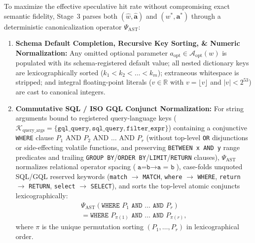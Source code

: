 \documentclass[10pt,conference]{IEEEtran}
\begin{document}
To maximize the effective speculative hit rate without compromising exact semantic fidelity, Stage~3 parses both $(\hat{w}, \hat{\mathbf{a}})$ and $(w^*, \mathbf{a}^*)$ through a deterministic canonicalization operator $\Psi_{\text{AST}}$:
\begin{enumerate}
    \item \textbf{Schema Default Completion, Recursive Key Sorting, \& Numeric Normalization:} Any omitted optional parameter $a_{\text{opt}} \in \mathcal{A}_{\text{opt}}(w)$ is populated with its schema-registered default value; all nested dictionary keys are lexicographically sorted ($k_1 < k_2 < \dots < k_m$); extraneous whitespace is stripped; and integral floating-point literals ($v \in \mathbb{R}$ with $v = \lfloor v \rfloor$ and $|v| < 2^{53}$) are cast to canonical integers.
    \item \textbf{Commutative SQL / ISO GQL Conjunct Normalization:} For string arguments bound to registered query-language keys ($\mathcal{K}_{\text{query\_args}} = \{\texttt{gql\_query}, \texttt{sql\_query}, \texttt{filter\_expr}\}$) containing a conjunctive \texttt{WHERE} clause $P_1 \text{ AND } P_2 \text{ AND } \dots \text{ AND } P_r$ (without top-level \texttt{OR} disjunctions or side-effecting volatile functions, and preserving \texttt{BETWEEN x AND y} range predicates and trailing \texttt{GROUP BY}/\texttt{ORDER BY}/\texttt{LIMIT}/\texttt{RETURN} clauses), $\Psi_{\text{AST}}$ normalizes relational operator spacing ($\texttt{a=b} \to \texttt{a = b}$), case-folds unquoted SQL/GQL reserved keywords (\texttt{match} $\to$ \texttt{MATCH}, \texttt{where} $\to$ \texttt{WHERE}, \texttt{return} $\to$ \texttt{RETURN}, \texttt{select} $\to$ \texttt{SELECT}), and sorts the top-level atomic conjuncts lexicographically:
    \begin{equation}
    \begin{aligned}
    \Psi_{\text{AST}}\!\left(\texttt{WHERE } P_1 \texttt{ AND } \dots \texttt{ AND } P_r\right) \\
    = \texttt{WHERE } P_{\pi(1)} \texttt{ AND } \dots \texttt{ AND } P_{\pi(r)},
    \end{aligned}
    \label{eq:where_canon}
    \end{equation}
    where $\pi$ is the unique permutation sorting $(P_1, \dots, P_r)$ in lexicographical order.
\end{enumerate}
\end{document}
